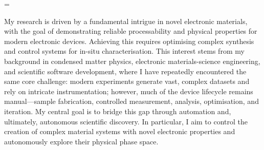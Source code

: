 \documentclass[10pt,a4paper,ragged2e,withhyper,paragraphstrue]{altacv}
\newcommand{\textalignment}{
	\justifying{}
    \tolerance=1 %
    \emergencystretch=\maxdimen{}
    \hyphenpenalty=10000 
    \hbadness=10000
}
\begin{document}
    

    {\textalignment{}
    



    My research is driven by a fundamental intrigue in novel electronic materials, with the goal of demonstrating reliable processability and physical properties for modern electronic devices. Achieving this requires optimising complex synthesis and control systems for in-situ characterisation. This interest stems from my background in condensed matter physics, electronic materials-science engineering, and scientific software development, where I have repeatedly encountered the same core challenge: modern experiments generate vast, complex datasets and rely on intricate instrumentation; however, much of the device lifecycle remains manual—sample fabrication, controlled measurement, analysis, optimisation, and iteration. My central goal is to bridge this gap through automation and, ultimately, autonomous scientific discovery. In particular, I aim to control the creation of complex material systems with novel electronic properties and autonomously explore their physical phase space.

}
\end{document}
